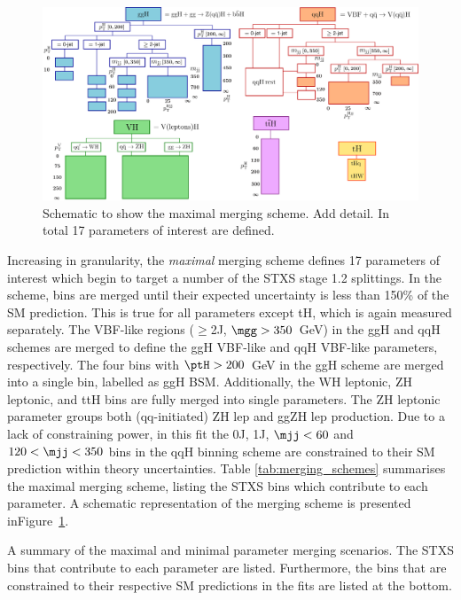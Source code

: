 \begin{figure}[htb!]
  \centering
  \includegraphics[width=1\linewidth]{Figures/app_merging_schemes/allSTXSbins_maximal.pdf}
  \caption[Schematic of the maximal merging scheme]
  {
    Schematic to show the maximal merging scheme. Add detail. In total 17 parameters of interest are defined.
  }
  \label{fig:maximal_scheme}
\end{figure}

Increasing in granularity, the \textit{maximal} merging scheme defines 17 parameters of interest which begin to target a number of the STXS stage 1.2 splittings. In the scheme, bins are merged until their expected uncertainty is less than 150\% of the SM prediction. This is true for all parameters except tH, which is again measured separately. The VBF-like regions ($\geq$2J, $\mgg>350$~GeV) in the ggH and qqH schemes are merged to define the ggH VBF-like and qqH VBF-like parameters, respectively. The four bins with $\ptH>200$~GeV in the ggH scheme are merged into a single bin, labelled as ggH BSM. Additionally, the WH leptonic, ZH leptonic, and ttH bins are fully merged into single parameters. The ZH leptonic parameter groups both (qq-initiated) ZH lep and ggZH lep production. Due to a lack of constraining power, in this fit the 0J, 1J, $\mjj<60$ and $120<\mjj<350$ bins in the qqH binning scheme are constrained to their SM prediction within theory uncertainties. Table \ref{tab:merging_schemes} summarises the maximal merging scheme, listing the STXS bins which contribute to each parameter. A schematic representation of the merging scheme is presented inFigure~\ref{fig:maximal_scheme}.

\begin{table}[htbp]
  \centering
  \scriptsize
  \renewcommand{\arraystretch}{1.2}
  \setlength{\tabcolsep}{2.2pt}
  \caption[Summary of the maximal and minimal parameter merging scenarios]
  {
    A summary of the maximal and minimal parameter merging scenarios. 
    The STXS bins that contribute to each parameter are listed. 
    Furthermore, the bins that are constrained to their respective SM predictions 
    in the fits are listed at the bottom.
  }
  \label{tab:merging_schemes}
  \hspace*{-1cm}
  
  \hspace*{-1cm}
\end{table}

